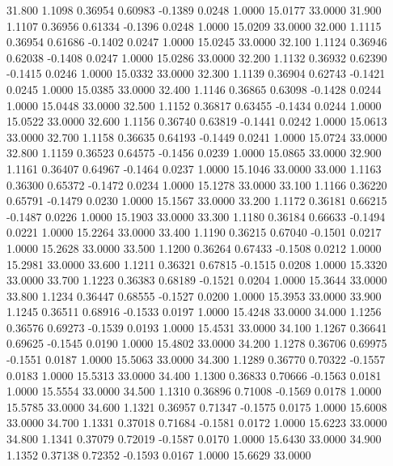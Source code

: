   31.800   1.1098   0.36954   0.60983  -0.1389   0.0248   1.0000  15.0177  33.0000
  31.900   1.1107   0.36956   0.61334  -0.1396   0.0248   1.0000  15.0209  33.0000
  32.000   1.1115   0.36954   0.61686  -0.1402   0.0247   1.0000  15.0245  33.0000
  32.100   1.1124   0.36946   0.62038  -0.1408   0.0247   1.0000  15.0286  33.0000
  32.200   1.1132   0.36932   0.62390  -0.1415   0.0246   1.0000  15.0332  33.0000
  32.300   1.1139   0.36904   0.62743  -0.1421   0.0245   1.0000  15.0385  33.0000
  32.400   1.1146   0.36865   0.63098  -0.1428   0.0244   1.0000  15.0448  33.0000
  32.500   1.1152   0.36817   0.63455  -0.1434   0.0244   1.0000  15.0522  33.0000
  32.600   1.1156   0.36740   0.63819  -0.1441   0.0242   1.0000  15.0613  33.0000
  32.700   1.1158   0.36635   0.64193  -0.1449   0.0241   1.0000  15.0724  33.0000
  32.800   1.1159   0.36523   0.64575  -0.1456   0.0239   1.0000  15.0865  33.0000
  32.900   1.1161   0.36407   0.64967  -0.1464   0.0237   1.0000  15.1046  33.0000
  33.000   1.1163   0.36300   0.65372  -0.1472   0.0234   1.0000  15.1278  33.0000
  33.100   1.1166   0.36220   0.65791  -0.1479   0.0230   1.0000  15.1567  33.0000
  33.200   1.1172   0.36181   0.66215  -0.1487   0.0226   1.0000  15.1903  33.0000
  33.300   1.1180   0.36184   0.66633  -0.1494   0.0221   1.0000  15.2264  33.0000
  33.400   1.1190   0.36215   0.67040  -0.1501   0.0217   1.0000  15.2628  33.0000
  33.500   1.1200   0.36264   0.67433  -0.1508   0.0212   1.0000  15.2981  33.0000
  33.600   1.1211   0.36321   0.67815  -0.1515   0.0208   1.0000  15.3320  33.0000
  33.700   1.1223   0.36383   0.68189  -0.1521   0.0204   1.0000  15.3644  33.0000
  33.800   1.1234   0.36447   0.68555  -0.1527   0.0200   1.0000  15.3953  33.0000
  33.900   1.1245   0.36511   0.68916  -0.1533   0.0197   1.0000  15.4248  33.0000
  34.000   1.1256   0.36576   0.69273  -0.1539   0.0193   1.0000  15.4531  33.0000
  34.100   1.1267   0.36641   0.69625  -0.1545   0.0190   1.0000  15.4802  33.0000
  34.200   1.1278   0.36706   0.69975  -0.1551   0.0187   1.0000  15.5063  33.0000
  34.300   1.1289   0.36770   0.70322  -0.1557   0.0183   1.0000  15.5313  33.0000
  34.400   1.1300   0.36833   0.70666  -0.1563   0.0181   1.0000  15.5554  33.0000
  34.500   1.1310   0.36896   0.71008  -0.1569   0.0178   1.0000  15.5785  33.0000
  34.600   1.1321   0.36957   0.71347  -0.1575   0.0175   1.0000  15.6008  33.0000
  34.700   1.1331   0.37018   0.71684  -0.1581   0.0172   1.0000  15.6223  33.0000
  34.800   1.1341   0.37079   0.72019  -0.1587   0.0170   1.0000  15.6430  33.0000
  34.900   1.1352   0.37138   0.72352  -0.1593   0.0167   1.0000  15.6629  33.0000

